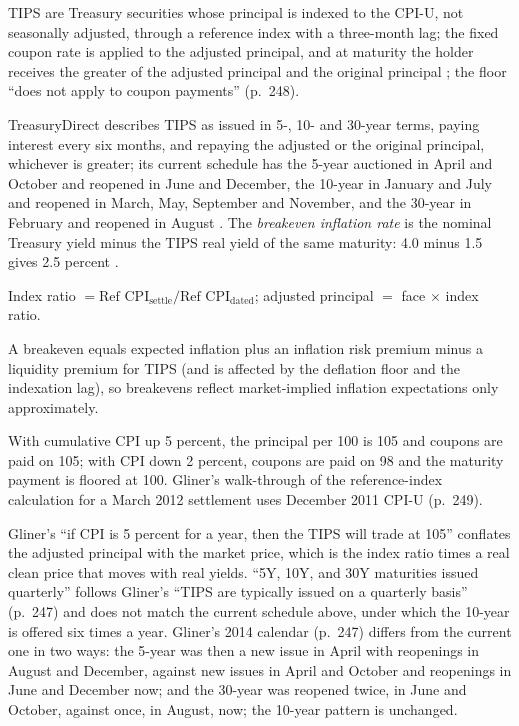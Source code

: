 \begin{qfdefinition}\label{def:tips-breakevens}
 TIPS are Treasury securities whose principal is indexed to the CPI-U, not seasonally adjusted, through a reference index with a three-month lag; the fixed coupon rate is applied to the adjusted principal, and at maturity the holder receives the greater of the adjusted principal and the original principal \citep[chap.~9, PDF pp.~247--249]{s7-gliner}; the floor ``does not apply to coupon payments'' (p.~248).

TreasuryDirect describes TIPS as issued in 5-, 10- and 30-year terms, paying interest every six months, and repaying the adjusted or the original principal, whichever is greater; its current schedule has the 5-year auctioned in April and October and reopened in June and December, the 10-year in January and July and reopened in March, May, September and November, and the 30-year in February and reopened in August \citep[web page]{treasurydirect-tips}. The \emph{breakeven inflation rate} is the nominal Treasury yield minus the TIPS real yield of the same maturity: 4.0 minus 1.5 gives 2.5 percent \citep[chap.~9, PDF p.~250]{s7-gliner}.

 Index ratio $=\text{Ref CPI}_{\text{settle}}/\text{Ref CPI}_{\text{dated}}$; adjusted principal $=$ face $\times$ index ratio.

 A breakeven equals expected inflation plus an inflation risk premium minus a liquidity premium for TIPS (and is affected by the deflation floor and the indexation lag), so breakevens reflect market-implied inflation expectations only approximately.

 With cumulative CPI up 5 percent, the principal per 100 is 105 and coupons are paid on 105; with CPI down 2 percent, coupons are paid on 98 and the maturity payment is floored at 100. Gliner's walk-through of the reference-index calculation for a March 2012 settlement uses December 2011 CPI-U (p.~249).

 Gliner's ``if CPI is 5 percent for a year, then the TIPS will trade at 105'' conflates the adjusted principal with the market price, which is the index ratio times a real clean price that moves with real yields. ``5Y, 10Y, and 30Y maturities issued quarterly'' follows Gliner's ``TIPS are typically issued on a quarterly basis'' (p.~247) and does not match the current schedule above, under which the 10-year is offered six times a year. Gliner's 2014 calendar (p.~247) differs from the current one in two ways: the 5-year was then a new issue in April with reopenings in August and December, against new issues in April and October and reopenings in June and December now; and the 30-year was reopened twice, in June and October, against once, in August, now; the 10-year pattern is unchanged.


\end{qfdefinition}
